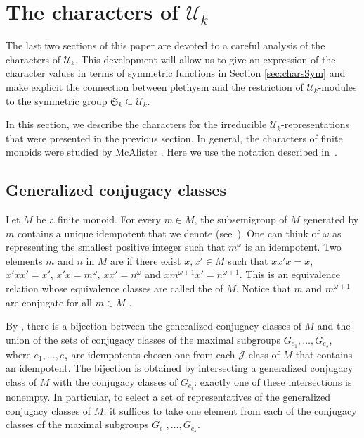 \section{The characters of $\mathcal{U}_k$}
\label{section.characters}
The last two sections of this paper are devoted to a careful analysis of the
characters of $\mathcal{U}_k$.  This development will allow
us to give an expression of the character values in terms of symmetric
functions in Section \ref{sec:charsSym} and make explicit the connection between
plethysm and the restriction of $\mathcal{U}_k$-modules to the symmetric
group $\mathfrak{S}_k \subseteq \mathcal{U}_k$.

In this section, we describe the characters for the irreducible
$\mathcal{U}_k$-representations that were presented in the previous section.
In general, the characters of finite monoids were studied by McAlister \cite{McAlister}.
Here we use the notation described in~\cite[Chapter 7]{Steinberg.2016}.

\subsection{Generalized conjugacy classes}
Let $M$ be a finite monoid. For every $m \in M$, the subsemigroup of $M$ generated
by $m$ contains a unique idempotent that we denote  (see~\cite[Corollary 1.2]{Steinberg.2016}). One
can think of $\omega$ as representing the smallest positive integer such that $m^\omega$ is an idempotent.
Two elements $m$ and $n$ in $M$ are  if there exist $x, x' \in M$ such that
$xx'x = x$, $x'xx' = x'$, $x'x = m^{\omega}$,
$xx' = n^{\omega}$ and $x m^{\omega +1}x' = n^{\omega +1}$.
This is an equivalence relation whose equivalence classes are called the
 of $M$.
Notice that $m$ and $m^{\omega + 1}$ are conjugate for all $m\in M$
\cite[Chapter 7]{Steinberg.2016}.

By \cite[Proposition~7.4]{Steinberg.2016},
there is a bijection between the generalized conjugacy classes of $M$
and the union of the sets of conjugacy classes of the maximal subgroups
$G_{e_1}, \ldots, G_{e_s}$, where $e_1, \ldots, e_s$ are idempotents chosen
one from each $\mathscr{J}$-class of $M$ that contains an idempotent.
The bijection is obtained by intersecting a generalized conjugacy
class of $M$ with the conjugacy classes of $G_{e_i}$: exactly one of these
intersections is nonempty.
In particular, to select a set of representatives of the generalized conjugacy
classes of $M$, it suffices to take one element from each of the conjugacy
classes of the maximal subgroups $G_{e_1}, \ldots, G_{e_s}$.

